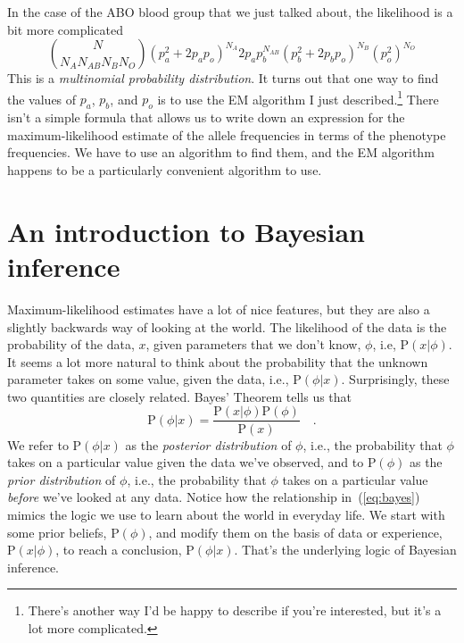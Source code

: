 \documentclass[12pt]{article}
\begin{document}
In the case of the ABO blood group that we just talked about, the
likelihood is a bit more complicated
\begin{equation}
{N \choose N_A N_{AB} N_B N_O}
\left(p_a^2 + 2p_ap_o\right)^{N_A}
2p_ap_b^{N_{AB}}
\left(p_b^2 + 2p_bp_o\right)^{N_B}
\left(p_o^2\right)^{N_O}
\end{equation}
This is a {\it multinomial probability distribution}. It turns out
that one way to find the values of $p_a$, $p_b$, and $p_o$ is to use
the EM algorithm I just described.\footnote{There's another way I'd be
  happy to describe if you're interested, but it's a lot more
  complicated.} There isn't a simple formula that allows us to write
down an expression for the maximum-likelihood estimate of the allele
frequencies in terms of the phenotype frequencies. We have to use an
algorithm to find them, and the EM algorithm happens to be a
particularly convenient algorithm to use. 

\section*{An introduction to Bayesian inference}

Maximum-likelihood estimates have a lot of nice features, but they are
also a slightly backwards way of looking at the world. The likelihood
of the data is the probability of the data, $x$, given parameters that
we don't know, $\phi$, i.e, $\mbox{P}(x|\phi)$. It seems a lot more
natural to think about the probability that the unknown parameter
takes on some value, given the data, i.e.,
$\mbox{P}(\phi|x)$. Surprisingly, these two quantities are closely
related. Bayes' Theorem tells us that
\begin{equation}
\mbox{P}(\phi|x) = \frac{\mbox{P}(x|\phi)\mbox{P}(\phi)}{\mbox{P}(x)} \quad .
\label{eq:bayes}
\end{equation}
We refer to $\mbox{P}(\phi|x)$ as the {\it posterior distribution} of
$\phi$, i.e., the probability that $\phi$ takes on a particular value
given the data we've observed, and to $\mbox{P}(\phi)$ as the {\it
  prior distribution} of $\phi$, i.e., the probability that $\phi$
takes on a particular value {\it before\/} we've looked at any
data. Notice how the relationship in~(\ref{eq:bayes}) mimics the logic
we use to learn about the world in everyday life. We start with some
prior beliefs, $\mbox{P}(\phi)$, and modify them on the basis of data
or experience, $\mbox{P}(x|\phi)$, to reach a conclusion,
$\mbox{P}(\phi|x)$. That's the underlying logic of Bayesian
inference.
\end{document}
